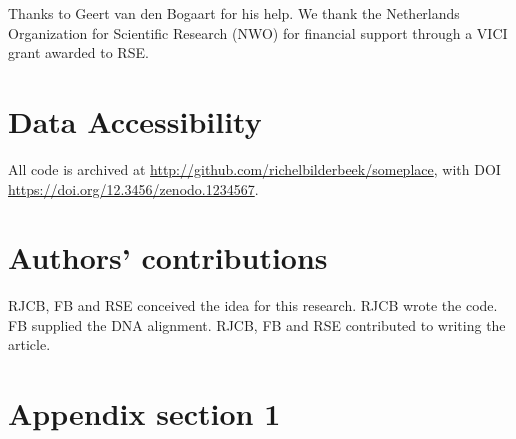 \documentclass{article}
\begin{document}
Thanks to Geert van den Bogaart for his help.
We thank the Netherlands 
Organization for Scientific Research (NWO) for financial support 
through a VICI grant awarded to RSE.

\section{Data Accessibility}

All code is archived at \url{http://github.com/richelbilderbeek/someplace},
with DOI \url{https://doi.org/12.3456/zenodo.1234567}.

\section{Authors' contributions}

RJCB, FB and RSE conceived the idea for this research. 
RJCB wrote the code.
FB supplied the DNA alignment.
RJCB, FB and RSE contributed to writing the article.




\appendix

\section{Appendix section 1}
\end{document}
